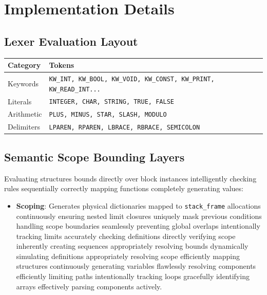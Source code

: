 \documentclass[12pt,a4paper]{article}
\begin{document}
\section{Implementation Details}
\subsection{Lexer Evaluation Layout}
\begin{longtable}{ll}
\toprule
\textbf{Category} & \textbf{Tokens} \\
\midrule
\endhead
Keywords & \texttt{KW\_INT, KW\_BOOL, KW\_VOID, KW\_CONST, KW\_PRINT, KW\_READ\_INT...} \\
Literals & \texttt{INTEGER, CHAR, STRING, TRUE, FALSE} \\
Arithmetic & \texttt{PLUS, MINUS, STAR, SLASH, MODULO} \\
Delimiters & \texttt{LPAREN, RPAREN, LBRACE, RBRACE, SEMICOLON} \\
\bottomrule
\end{longtable}

\subsection{Semantic Scope Bounding Layers}
Evaluating structures bounds directly over block instances intelligently checking rules sequentially correctly mapping functions completely generating values:
\begin{itemize}
    \item \textbf{Scoping}: Generates physical dictionaries mapped to \texttt{stack\_frame} allocations continuously ensuring nested limit closures uniquely mask previous conditions handling scope boundaries seamlessly preventing global overlaps intentionally tracking limits accurately checking definitions directly verifying scope inherently creating sequences appropriately resolving bounds dynamically simulating definitions appropriately resolving scope efficiently mapping structures continuously generating variables flawlessly resolving components efficiently limiting paths intentionally tracking loops gracefully identifying arrays effectively parsing components actively.
\end{itemize}
\end{document}
